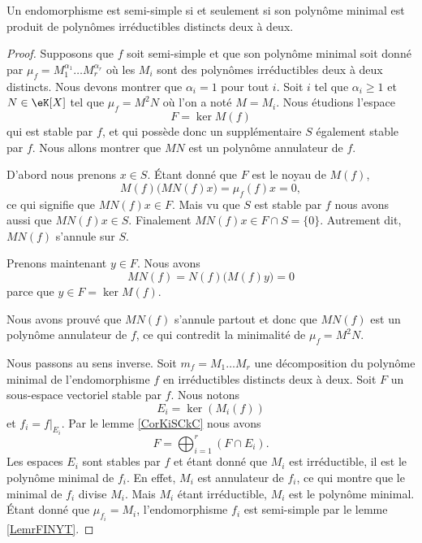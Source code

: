 \begin{theorem} \label{ThoFgsxCE}
    Un endomorphisme est semi-simple si et seulement si son polynôme minimal est produit de polynômes irréductibles distincts deux à deux.
\end{theorem}

\begin{proof}

    Supposons que \( f\) soit semi-simple et que son polynôme minimal soit donné par \( \mu_f=M_1^{\alpha_1}\ldots M_r^{\alpha_r}\) où les \( M_i\) sont des polynômes irréductibles deux à deux distincts. Nous devons montrer que \( \alpha_i=1\) pour tout \( i\). Soit \( i\) tel que \( \alpha_i\geq 1\) et \( N\in \eK[X]\) tel que \( \mu_f=M^2N\) où l'on a noté \( M=M_i\). Nous étudions l'espace
    \begin{equation}
        F=\ker M(f)
    \end{equation}
    qui est stable par \( f\), et qui possède donc un supplémentaire \( S\) également stable par \( f\). Nous allons montrer que \( MN\) est un polynôme annulateur de \( f\).

    D'abord nous prenons \( x\in S\). Étant donné que \( F\) est le noyau de \( M(f)\),
    \begin{equation}
        M(f)\big( MN(f)x \big)=\mu_f(f)x=0,
    \end{equation}
    ce qui signifie que \( MN(f)x\in F\). Mais vu que \( S\) est stable par \( f\) nous avons aussi que \( MN(f)x\in S\). Finalement \( MN(f)x\in F\cap S=\{ 0 \}\). Autrement dit, \( MN(f)\) s'annule sur \( S\).

    Prenons maintenant \( y\in F\). Nous avons
    \begin{equation}
        MN(f)=N(f)\big( M(f)y \big)=0
    \end{equation}
    parce que \( y\in F=\ker M(f)\).

    Nous avons prouvé que \( MN(f)\) s'annule partout et donc que \( MN(f)\) est un polynôme annulateur de \( f\), ce qui contredit la minimalité de \( \mu_f=M^2N\).

    Nous passons au sens inverse. Soit \( m_f=M_1\ldots M_r\) une décomposition du polynôme minimal de l'endomorphisme \( f\) en irréductibles distincts deux à deux. Soit \( F\) un sous-espace vectoriel stable par \( f\). Nous notons
    \begin{equation}
        E_i=\ker(M_i(f))
    \end{equation}
    et \( f_i=f|_{E_i}\). Par le lemme \ref{CorKiSCkC} nous avons
    \begin{equation}
        F=\bigoplus_{i=1}^r(F\cap E_i).
    \end{equation}
    Les espaces \( E_i\) sont stables par \( f\) et étant donné que \( M_i\) est irréductible, il est le polynôme minimal de \( f_i\). En effet, \( M_i\) est annulateur de \( f_i\), ce qui montre que le minimal de \( f_i\) divise \( M_i\). Mais \( M_i\) étant irréductible, \( M_i\) est le polynôme minimal. Étant donné que \( \mu_{f_i}=M_i\), l'endomorphisme \( f_i\) est semi-simple par le lemme \ref{LemrFINYT}.


\end{proof}
